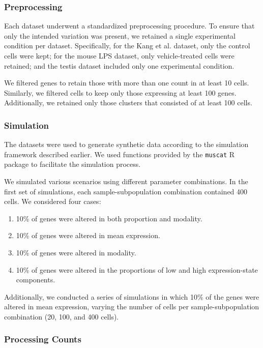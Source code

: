 \documentclass[a4paper, 11pt, twocolumn]{article}
\begin{document}
\subsubsection{Preprocessing}

Each dataset underwent a standardized preprocessing procedure. To ensure that only the intended variation was present, we retained a single experimental condition per dataset. Specifically, for the Kang et al. dataset, only the control cells were kept; for the mouse LPS dataset, only vehicle-treated cells were retained; and the testis dataset included only one experimental condition.

We filtered genes to retain those with more than one count in at least 10 cells. Similarly, we filtered cells to keep only those expressing at least 100 genes. Additionally, we retained only those clusters that consisted of at least 100 cells.

\subsubsection{Simulation}

The datasets were used to generate synthetic data according to the simulation framework described earlier. We used functions provided by the \texttt{muscat} R package \citep{muscat} to facilitate the simulation process.

We simulated various scenarios using different parameter combinations. In the first set of simulations, each sample-subpopulation combination contained 400 cells. We considered four cases:
\begin{enumerate}
	\item 10\% of genes were altered in both proportion and modality.
	\item 10\% of genes were altered in mean expression.
	\item 10\% of genes were altered in modality.
	\item 10\% of genes were altered in the proportions of low and high expression-state components.
\end{enumerate}

Additionally, we conducted a series of simulations in which 10\% of the genes were altered in mean expression, varying the number of cells per sample-subpopulation combination (20, 100, and 400 cells).

\subsubsection{Processing Counts}
\end{document}
